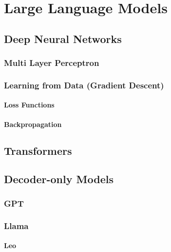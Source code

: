 \chapter{Large Language Models}\label{ch:techOverview}

\section{Deep Neural Networks}\label{sec:dnn}

\subsection{Multi Layer Perceptron}\label{subsec:multi-layer-perceptron}

\subsection{Learning from Data (Gradient Descent)}\label{subsec:learning-from-data}

\subsubsection{Loss Functions}

\subsubsection{Backpropagation}

\section{Transformers}\label{sec:trans}

\section{Decoder-only Models}\label{sec:decoder}

\subsection{GPT}\label{subsec:gpt}

\subsection{Llama}\label{subsec:llama}

\subsubsection{Leo}

